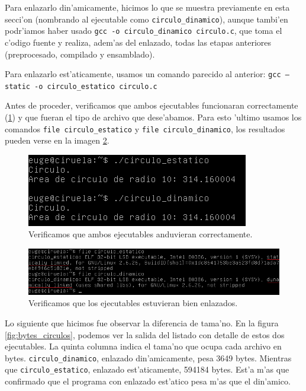 \documentclass[11pt]{article}
\begin{document}
		Para enlazarlo din'amicamente, hicimos lo que se muestra previamente en esta secci'on (nombrando al ejecutable como \texttt{circulo\_dinamico}), aunque tambi'en podr'iamos haber usado \texttt{gcc -o circulo\_dinamico circulo.c}, que toma el c'odigo fuente y realiza, adem'as del enlazado, todas las etapas anteriores (preprocesado, compilado y ensamblado).

		Para enlazarlo est'aticamente, usamos un comando parecido al anterior: \texttt{gcc --static -o circulo\_estatico circulo.c}

		Antes de proceder, verificamos que ambos ejecutables funcionaran correctamente (\ref{fig:andan}) y que fueran el tipo de archivo que dese'abamos. Para esto 'ultimo usamos los comandos \texttt{file circulo\_estatico} y \texttt{file circulo\_dinamico}, los resultados pueden verse en la imagen \ref{fig:bien_enlazados}.

		\begin{figure}[H]
			\centering
   			\includegraphics{Images/Seccion 1/ambos_andan.png}
    			\caption{Verificamos que ambos ejecutables anduvieran correctamente.}
    			\label{fig:andan}
		\end{figure}

		\begin{figure}[H]
    			\centering
    			\includegraphics[scale=0.65]{Images/Seccion 1/bien_enlazados_.png}
    			\caption{Verificamos que los ejecutables estuvieran bien enlazados.}
    			\label{fig:bien_enlazados}
		\end{figure}
 
		Lo siguiente que hicimos fue observar la diferencia de tama'no. En la figura \ref{fig:bytes_circulos}, podemos ver la salida del listado con detalle de estos dos ejecutables. La quinta columna indica el tama'no que ocupa cada archivo en bytes. \texttt{circulo\_dinamico}, enlazado din'amicamente, pesa 3649 bytes. Mientras que \texttt{circulo\_estatico}, enlazado est'aticamente, 594184 bytes. Est'a m'as que confirmado que el programa con enlazado est'atico pesa m'as que el din'amico.
\end{document}
